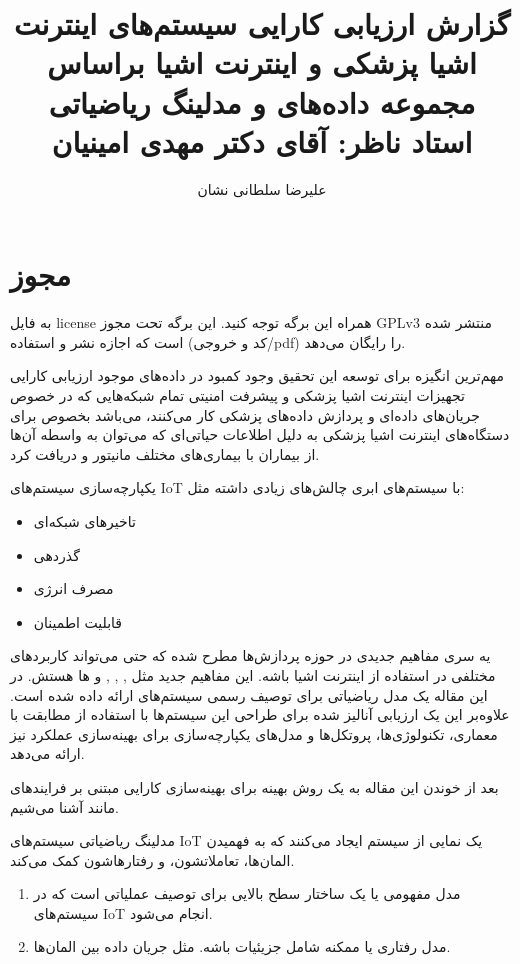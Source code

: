 \documentclass[a4paper]{article}
\title{گزارش ارزیابی کارایی سیستم‌های اینترنت اشیا پزشکی و اینترنت اشیا براساس
مجموعه داده‌های \lr{CICIoMT2024} و مدلینگ ریاضیاتی \\ استاد ناظر: آقای دکتر مهدی
امینیان}
\author{علیرضا سلطانی نشان}
\begin{document}
\maketitle
\tableofcontents

\section*{مجوز}

به فایل license همراه این برگه توجه کنید. این برگه تحت مجوز GPLv3 منتشر شده است
که اجازه نشر و استفاده (کد و خروجی/pdf) را رایگان می‌دهد.

مهم‌ترین انگیزه برای توسعه این تحقیق وجود کمبود در داده‌های موجود ارزیابی کارایی
تجهیزات اینترنت اشیا پزشکی و پیشرفت امنیتی تمام شبکه‌هایی که در خصوص جریان‌های
داده‌ای و پردازش داده‌های پزشکی کار می‌کنند، می‌باشد بخصوص برای دستگاه‌های
اینترنت اشیا پزشکی به دلیل اطلاعات حیاتی‌ای که می‌توان به واسطه آن‌ها از بیماران
با بیماری‌های مختلف مانیتور و دریافت کرد.

\newpage

یکپارچه‌سازی سیستم‌های IoT با سیستم‌های ابری چالش‌های زیادی داشته مثل:

\begin{itemize}
    \item تاخیر‌های شبکه‌ای
    \item گذردهی
    \item مصرف انرژی
    \item قابلیت اطمینان
\end{itemize}

یه سری مفاهیم جدیدی در حوزه پردازش‌ها مطرح شده که حتی می‌تواند کاربرد‌های مختلفی
در استفاده از اینترنت اشیا باشه. این مفاهیم جدید مثل ,
, ,  و
 ‌ها هستش.  در این مقاله یک مدل ریاضیاتی برای توصیف رسمی سیستم‌های
 ارائه داده شده است.  علاوه‌بر این یک ارزیابی آنالیز شده برای طراحی این
سیستم‌ها با استفاده از مطابقت با معماری، تکنولوژی‌ها، پروتکل‌ها و مدل‌های
یکپارچه‌سازی برای بهینه‌سازی عملکرد نیز ارائه می‌دهد.


بعد از خوندن این مقاله به یک روش بهینه برای بهینه‌سازی کارایی مبتنی بر
فرایند‌های  مانند  آشنا می‌شیم.

مدلینگ ریاضیاتی سیستم‌های IoT یک نمایی از سیستم ایجاد می‌کنند که به فهمیدن
المان‌ها، تعاملاتشون، و رفتار‌هاشون کمک می‌کند.

\begin{enumerate}
    \item مدل مفهومی یا  یک ساختار سطح بالایی برای توصیف
    عملیاتی است که در سیستم‌های IoT انجام می‌شود.
    \item مدل رفتاری یا  ممکنه شامل جزیئیات باشه. مثل جریان
    داده بین المان‌ها.
\end{enumerate}
\end{document}
